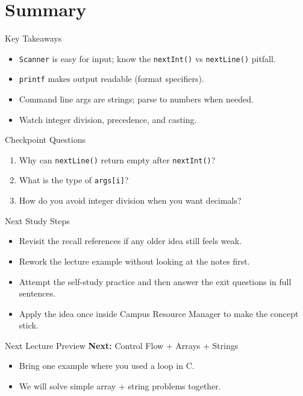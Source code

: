\documentclass{beamer}
\begin{document}
\section{Summary}
\label{sec:summary}

\begin{frame}{Key Takeaways}
  \begin{itemize}[<+->]
    \item \texttt{Scanner} is easy for input; know the \texttt{nextInt()} vs \texttt{nextLine()} pitfall.
    \item \texttt{printf} makes output readable (format specifiers).
    \item Command line args are strings; parse to numbers when needed.
    \item Watch integer division, precedence, and casting.
  \end{itemize}
  \slidesources{\OOPSUnitISources}
\end{frame}

\begin{frame}{Checkpoint Questions}
  \begin{enumerate}[<+->]
    \item Why can \texttt{nextLine()} return empty after \texttt{nextInt()}?
    \item What is the type of \texttt{args[i]}?
    \item How do you avoid integer division when you want decimals?
  \end{enumerate}
  \slidesources{\OOPSUnitISources}
\end{frame}

\begin{frame}{Next Study Steps}
\begin{itemize}[<+->]
  \item Revisit the recall references if any older idea still feels weak.
  \item Rework the lecture example without looking at the notes first.
  \item Attempt the self-study practice and then answer the exit questions in full sentences.
  \item Apply the idea once inside Campus Resource Manager to make the concept stick.
\end{itemize}
  \slidesources{\OOPSUnitISources}
\end{frame}

\begin{frame}{Next Lecture Preview}
  \textbf{Next:} Control Flow + Arrays + Strings
  \vspace{0.6em}
  \begin{itemize}[<+->]
    \item Bring one example where you used a loop in C.
    \item We will solve simple array + string problems together.
  \end{itemize}
  \slidesources{\OOPSUnitISources}
\end{frame}
\end{document}
